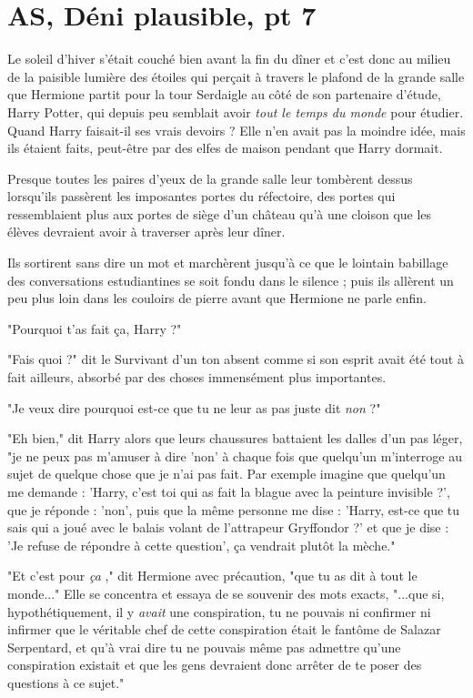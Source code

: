 
\chapter{AS, Déni plausible, pt 7}

Le soleil d'hiver s'était couché bien avant la fin du dîner et c'est donc au milieu de la paisible lumière des étoiles qui perçait à travers le plafond de la grande salle que Hermione partit pour la tour Serdaigle au côté de son partenaire d'étude, Harry Potter, qui depuis peu semblait avoir \emph{tout le temps du monde}  pour étudier. Quand Harry faisait-il ses vrais devoirs ? Elle n'en avait pas la moindre idée, mais ils étaient faits, peut-être par des elfes de maison pendant que Harry dormait.

Presque toutes les paires d'yeux de la grande salle leur tombèrent dessus lorsqu'ils passèrent les imposantes portes du réfectoire, des portes qui ressemblaient plus aux portes de siège d'un château qu'à une cloison que les élèves devraient avoir à traverser après leur dîner.

Ils sortirent sans dire un mot et marchèrent jusqu'à ce que le lointain babillage des conversations estudiantines se soit fondu dans le silence ; puis ils allèrent un peu plus loin dans les couloirs de pierre avant que Hermione ne parle enfin.

"Pourquoi t'as fait ça, Harry ?"

"Fais quoi ?" dit le Survivant d'un ton absent comme si son esprit avait été tout à fait ailleurs, absorbé par des choses immensément plus importantes.

"Je veux dire pourquoi est-ce que tu ne leur as pas juste dit \emph{non}  ?"

"Eh bien," dit Harry alors que leurs chaussures battaient les dalles d'un pas léger, "je ne peux pas m'amuser à dire 'non' à chaque fois que quelqu'un m'interroge au sujet de quelque chose que je n'ai pas fait. Par exemple imagine que quelqu'un me demande : 'Harry, c'est toi qui as fait la blague avec la peinture invisible ?', que je réponde : 'non', puis que la même personne me dise : 'Harry, est-ce que tu sais qui a joué avec le balais volant de l'attrapeur Gryffondor ?' et que je dise : 'Je refuse de répondre à cette question', ça vendrait plutôt la mèche."

"Et c'est pour \emph{ça} ," dit Hermione avec précaution, "que tu as dit à tout le monde..." Elle se concentra et essaya de se souvenir des mots exacts, "...que si, hypothétiquement, il y \emph{avait}  une conspiration, tu ne pouvais ni confirmer ni infirmer que le véritable chef de cette conspiration était le fantôme de Salazar Serpentard, et qu'à vrai dire tu ne pouvais même pas admettre qu'une conspiration existait et que les gens devraient donc arrêter de te poser des questions à ce sujet."

